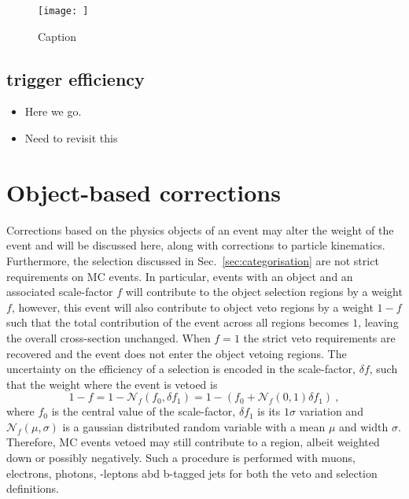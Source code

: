 \begin{figure}[htbp]
    \centering
    \texttt{[image: ]}
    \caption{Caption}
    \label{fig:electron-trigger-efficiency}
\end{figure}


\subsection{\ptmiss trigger efficiency}

\begin{itemize}
    \item Here we go.
    \item Need to revisit this
\end{itemize}



\section{Object-based corrections}


Corrections based on the physics objects of an event may alter the weight of
the event and will be discussed here, along with corrections to particle
kinematics. Furthermore, the selection discussed in
Sec.~\ref{sec:categorisation} are not strict requirements on MC events. In
particular, events with an object and an associated scale-factor $f$ will
contribute to the object selection regions by a weight $f$, however, this
event will also contribute to object veto regions by a weight $1-f$ such that
the total contribution of the event across all regions becomes $1$, leaving
the overall cross-section unchanged. When $f=1$ the strict veto requirements
are recovered and the event does not enter the object vetoing regions. The
uncertainty on the efficiency of a selection is encoded in the scale-factor,
$\delta f$, such that the weight where the event is vetoed is
%
\begin{equation}
    1 - f = 1 - \mathcal{N}_f(f_0,\delta f_1) = 1 - (f_0 + \mathcal{N}_f(0,1)\delta f_1)\ ,
\end{equation}
%
where $f_0$ is the central value of the scale-factor, $\delta f_1$ is its
$1\sigma$ variation and $\mathcal{N}_f(\mu,\sigma)$ is a gaussian distributed
random variable with a mean $\mu$ and width $\sigma$. Therefore, MC events
vetoed may still contribute to a region, albeit weighted down or possibly
negatively. Such a procedure is performed with muons, electrons, photons,
\Ptauh-leptons abd b-tagged jets for both the veto and selection definitions.


